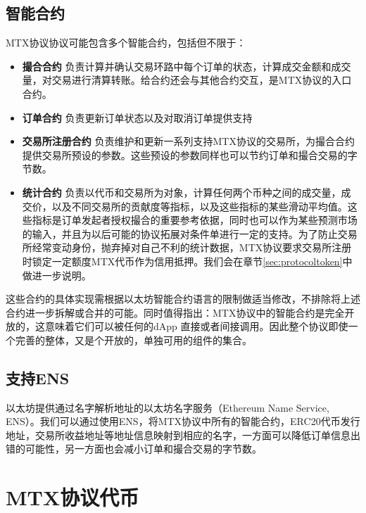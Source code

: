 \documentclass[UTF8,nofonts]{ctexart}
\begin{document}
\subsection{智能合约\label{sec:contracts}}

MTX协议协议可能包含多个智能合约，包括但不限于：

\begin{itemize}
	\item  \textbf{撮合合约} 负责计算并确认交易环路中每个订单的状态，计算成交金额和成交量，对交易进行清算转账。给合约还会与其他合约交互，是MTX协议的入口合约。
	\item   \textbf{订单合约} 负责更新订单状态以及对取消订单提供支持
	\item  \textbf{交易所注册合约}  负责维护和更新一系列支持MTX协议的交易所，为撮合合约提供交易所预设的参数。这些预设的参数同样也可以节约订单和撮合交易的字节数。
	\item \textbf{统计合约}  负责以代币和交易所为对象，计算任何两个币种之间的成交量，成交价，以及不同交易所的贡献度等指标，以及这些指标的某些滑动平均值。这些指标是订单发起者授权撮合的重要参考依据，同时也可以作为某些预测市场的输入，并且为以后可能的协议拓展对条件单进行一定的支持。为了防止交易所经常变动身份，抛弃掉对自己不利的统计数据，MTX协议要求交易所注册时锁定一定额度MTX代币作为信用抵押。我们会在章节\ref{sec:protocoltoken}中做进一步说明。
\end{itemize}

这些合约的具体实现需根据以太坊智能合约语言的限制做适当修改，不排除将上述合约进一步拆解或合并的可能。同时值得指出：MTX协议中的智能合约是完全开放的，这意味着它们可以被任何的dApp 直接或者间接调用。因此整个协议即使一个完善的整体，又是个开放的，单独可用的组件的集合。


\subsection{支持ENS\label{sec:registration}}

以太坊提供通过名字解析地址的以太坊名字服务（Ethereum Name Service, ENS）\cite{hirai2016formal}。我们可以通过使用ENS，将MTX协议中所有的智能合约，ERC20代币发行地址，交易所收益地址等地址信息映射到相应的名字，一方面可以降低订单信息出错的可能性，另一方面也会减小订单和撮合交易的字节数。



\section{MTX协议代币\label{sec:protocoltoken}}
\end{document}
